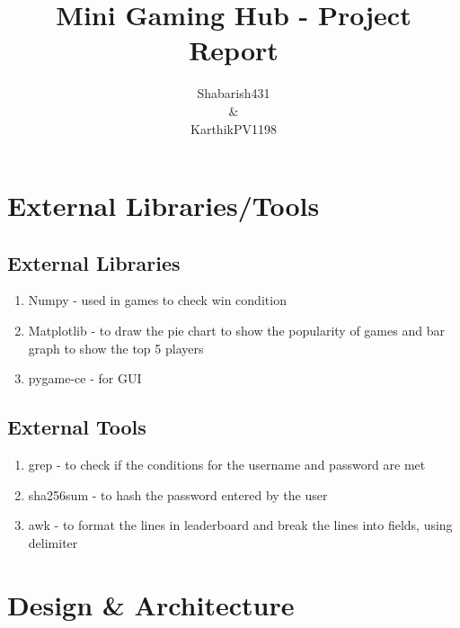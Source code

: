 \documentclass[12pt]{article}
\title{Mini Gaming Hub - Project Report}
\author{Shabarish431 \\ \& \\ KarthikPV1198}
\begin{document}
\maketitle

\section{External Libraries/Tools}
\label{sec:ELT}
\subsection{External Libraries}
\begin{enumerate}
    \item Numpy - used in games to check win condition
    \item Matplotlib - to draw the pie chart to show the popularity of games and bar graph to show the top 5 players
    \item pygame-ce - for GUI
\end{enumerate}
\subsection{External Tools}
\begin{enumerate}
    \item grep - to check if the conditions for the username and password are met
    \item sha256sum - to hash the password entered by the user
    \item awk - to format the lines in leaderboard and break the lines into fields, using delimiter
\end{enumerate}

\section{Design \& Architecture}
\end{document}
